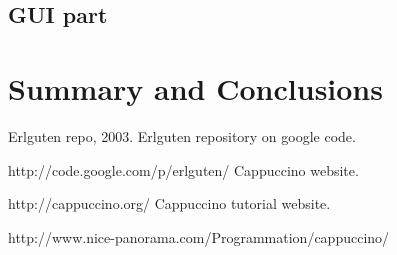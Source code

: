 \documentclass[12pt,twoside,a4paper]{report}
\begin{document}
\section{GUI part}

\chapter{Summary and Conclusions}

\begin{thebibliography}{9}
Erlguten repo, 2003. Erlguten repository on google code. 

http://code.google.com/p/erlguten/
 Cappuccino website. 

http://cappuccino.org/
 Cappuccino tutorial website. 

http://www.nice-panorama.com/Programmation/cappuccino/
\end{thebibliography}
\end{document}
